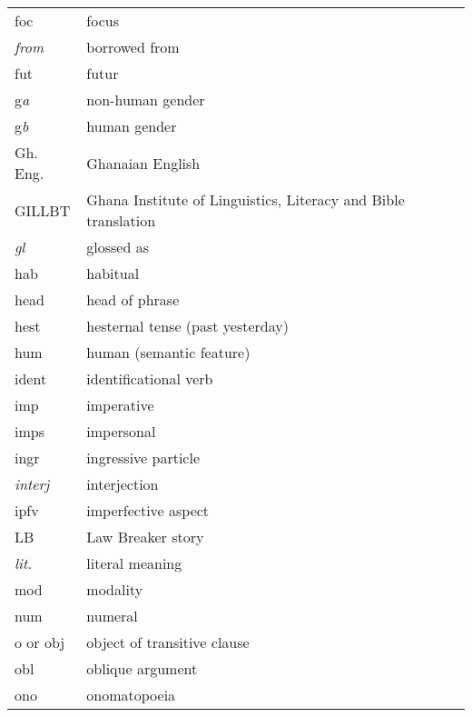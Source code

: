 \begin{xtabular}{ll}
 {\sc foc} & focus \\
  {\it from} & borrowed from \\
{\sc fut} &  futur\\


{\sc g}{\it a} & non-human gender  \\
{\sc g}{\it b} &  human gender\\
Gh. Eng. & Ghanaian English\\
GILLBT & Ghana Institute of Linguistics, Literacy and Bible translation\\
{\it gl} & glossed as\\

{\sc hab} & habitual \\ %
{\sc head} & head of phrase \\ %
 {\sc hest} & hesternal tense (past yesterday) \\
 {\sc hum} & human   (semantic feature)\\

{\sc ident} & identificational verb\\ %
{\sc imp} & imperative\\ %
{\sc imps} & impersonal\\ %
{\sc ingr} & ingressive particle\\
{\it interj} & interjection\\ %
{\sc ipfv} &  imperfective aspect\\%


LB  & Law Breaker story\\
{\it lit.} & literal meaning\\

 {\sc mod} &  modality \\

{\sc num} &  numeral\\ %

{\sc o} or {\sc obj} & object of transitive clause\\
{\sc obl} & oblique argument\\
 {\sc ono} & onomatopoeia \\


\end{xtabular}
